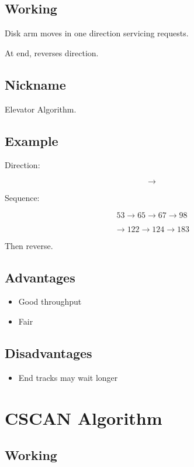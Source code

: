 \subsection{Working}

Disk arm moves in one direction servicing requests.

At end, reverses direction.

\subsection{Nickname}

Elevator Algorithm.

\subsection{Example}

Direction:

\[
\rightarrow
\]

Sequence:

\[
53 \rightarrow 65 \rightarrow 67 \rightarrow 98
\]

\[
\rightarrow 122 \rightarrow 124 \rightarrow 183
\]

Then reverse.

\subsection{Advantages}

\begin{itemize}
\item Good throughput
\item Fair
\end{itemize}

\subsection{Disadvantages}

\begin{itemize}
\item End tracks may wait longer
\end{itemize}

\section{CSCAN Algorithm}

\subsection{Working}

